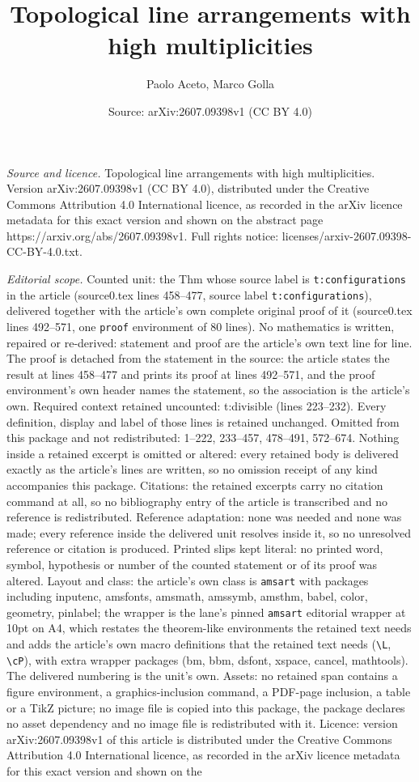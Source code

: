 \documentclass[10pt,a4paper]{amsart}
\title[Topological line arrangements with high multiplicities]{Topological line arrangements with high multiplicities}
\author{Paolo Aceto, Marco Golla}
\date{Source: arXiv:2607.09398v1 (CC BY 4.0)}
\begin{document}
\maketitle

\noindent\emph{Source and licence.} Topological line arrangements with high multiplicities. Version arXiv:2607.09398v1 (CC BY 4.0), distributed under the Creative Commons Attribution 4.0 International licence, as recorded in the arXiv licence metadata for this exact version and shown on the abstract page https://arxiv.org/abs/2607.09398v1. Full rights notice: licenses/arxiv-2607.09398-CC-BY-4.0.txt.\par\smallskip

\noindent\textit{Editorial scope.} Counted unit: the Thm whose source label is \texttt{t:configurations} in the article (source0.tex lines 458--477, source label \texttt{t:configurations}), delivered together with the article's own complete original proof of it (source0.tex lines 492--571, one \texttt{proof} environment of 80 lines). No mathematics is written, repaired or re-derived: statement and proof are the article's own text line for line. The proof is detached from the statement in the source: the article states the result at lines 458--477 and prints its proof at lines 492--571, and the proof environment's own header names the statement, so the association is the article's own. Required context retained uncounted: t:divisible (lines 223--232). Every definition, display and label of those lines is retained unchanged. Omitted from this package and not redistributed: 1--222, 233--457, 478--491, 572--674. Nothing inside a retained excerpt is omitted or altered: every retained body is delivered exactly as the article's lines are written, so no omission receipt of any kind accompanies this package. Citations: the retained excerpts carry no citation command at all, so no bibliography entry of the article is transcribed and no reference is redistributed. Reference adaptation: none was needed and none was made; every reference inside the delivered unit resolves inside it, so no unresolved reference or citation is produced. Printed slips kept literal: no printed word, symbol, hypothesis or number of the counted statement or of its proof was altered. Layout and class: the article's own class is \texttt{amsart} with packages including inputenc, amsfonts, amsmath, amssymb, amsthm, babel, color, geometry, pinlabel; the wrapper is the lane's pinned \texttt{amsart} editorial wrapper at 10pt on A4, which restates the theorem-like environments the retained text needs and adds the article's own macro definitions that the retained text needs (\texttt{\textbackslash L}, \texttt{\textbackslash cP}), with extra wrapper packages (bm, bbm, dsfont, xspace, cancel, mathtools). The delivered numbering is the unit's own. Assets: no retained span contains a figure environment, a graphics-inclusion command, a PDF-page inclusion, a table or a TikZ picture; no image file is copied into this package, the package declares no asset dependency and no image file is redistributed with it. Licence: version arXiv:2607.09398v1 of this article is distributed under the Creative Commons Attribution 4.0 International licence, as recorded in the arXiv licence metadata for this exact version and shown on the 
\end{document}
